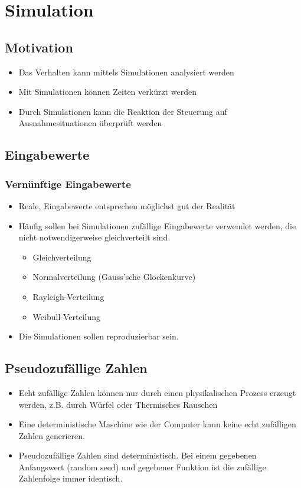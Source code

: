 \section{Simulation}

\subsection{Motivation}
\begin{itemize}
	\item Das Verhalten kann mittels Simulationen analysiert werden
	\item Mit Simulationen können Zeiten verkürzt werden
	\item Durch Simulationen kann die Reaktion der Steuerung auf Ausnahmesituationen überprüft werden
\end{itemize}

\subsection{Eingabewerte}
\subsubsection{Vernünftige Eingabewerte}
\begin{itemize}
	\item Reale, Eingabewerte entsprechen möglichst gut der Realität
	\item Häufig sollen bei Simulationen zufällige Eingabewerte verwendet werden, die nicht notwendigerweise gleichverteilt sind.
	\begin{itemize}
		\item Gleichverteilung
		\item Normalverteilung (Gauss'sche Glockenkurve)
		\item Rayleigh-Verteilung
		\item Weibull-Verteilung
	\end{itemize}
	\item Die Simulationen sollen reproduzierbar sein.
\end{itemize}

\subsection{Pseudozufällige Zahlen}
\begin{itemize}
	\item Echt zufällige Zahlen können nur durch einen physikalischen Prozess erzeugt werden, z.B. durch Würfel oder Thermisches Rauschen
	\item Eine deterministische Maschine wie der Computer kann keine echt zufälligen Zahlen generieren.
	\item Pseudozufällige Zahlen sind deterministisch. Bei einem gegebenen	Anfangswert (random seed) und gegebener Funktion ist die zufällige Zahlenfolge immer identisch.
\end{itemize}

